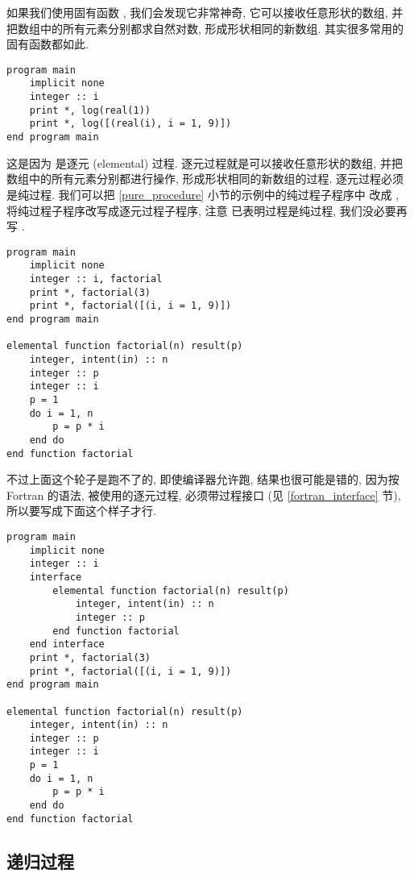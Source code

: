 如果我们使用固有函数 , 我们会发现它非常神奇, 它可以接收任意形状的数组, 并把数组中的所有元素分别都求自然对数, 形成形状相同的新数组. 其实很多常用的固有函数都如此.
\begin{lstlisting}
program main
    implicit none
    integer :: i
    print *, log(real(1))
    print *, log([(real(i), i = 1, 9)])
end program main
\end{lstlisting}
这是因为  是逐元 (elemental) 过程. 逐元过程就是可以接收任意形状的数组, 并把数组中的所有元素分别都进行操作, 形成形状相同的新数组的过程. 逐元过程必须是纯过程. 我们可以把 \ref{pure_procedure} 小节的示例中的纯过程子程序中  改成 , 将纯过程子程序改写成逐元过程子程序, 注意  已表明过程是纯过程, 我们没必要再写 .
\begin{lstlisting}
program main
    implicit none
    integer :: i, factorial
    print *, factorial(3)
    print *, factorial([(i, i = 1, 9)])
end program main

elemental function factorial(n) result(p)
    integer, intent(in) :: n
    integer :: p
    integer :: i 
    p = 1
    do i = 1, n
        p = p * i
    end do
end function factorial
\end{lstlisting}
不过上面这个轮子是跑不了的, 即使编译器允许跑, 结果也很可能是错的, 因为按 Fortran 的语法, 被使用的逐元过程, 必须带过程接口 (见 \ref{fortran_interface} 节), 所以要写成下面这个样子才行.\label{elemental_procedure_program} 
\begin{lstlisting}
program main
    implicit none
    integer :: i
    interface
        elemental function factorial(n) result(p)
            integer, intent(in) :: n
            integer :: p
        end function factorial
    end interface
    print *, factorial(3)
    print *, factorial([(i, i = 1, 9)])
end program main

elemental function factorial(n) result(p)
    integer, intent(in) :: n
    integer :: p
    integer :: i 
    p = 1
    do i = 1, n
        p = p * i
    end do
end function factorial
\end{lstlisting}

\subsection{递归过程}

